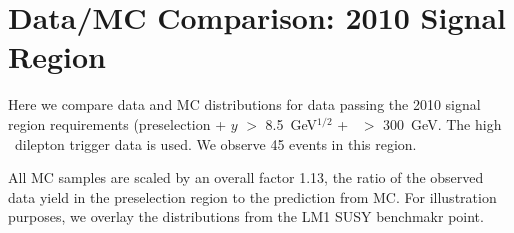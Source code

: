 \section{Data/MC Comparison: 2010 Signal Region}
\label{sec:appendix_datamc_sig}
Here we compare data and MC distributions for data passing the 
2010 signal region requirements (preselection + $y$ $>$ 8.5~GeV$^{1/2}$
+ \Ht\ $>$ 300~GeV. The high \pt\ dilepton trigger
data is used. We observe 45 events in this region.

All MC samples are scaled by an overall factor 1.13,
the ratio of the observed data yield in the preselection region to the
prediction from MC.
For illustration purposes, we overlay the distributions from the LM1
SUSY benchmakr point.

\clearpage


